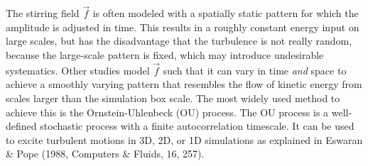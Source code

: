 The stirring field $\vec{f}$ is often modeled with a spatially static pattern for which the amplitude
is adjusted in time. This results in a roughly constant energy input on large scales, but has the
disadvantage that the turbulence is not really random, because the large-scale pattern is fixed, which
may introduce undesirable systematics. Other studies model $\vec{f}$ such that it can vary in time
\emph{and} space to achieve a smoothly varying pattern that resembles the flow of kinetic energy from
scales larger than the simulation box scale. The most widely used method to achieve this is the
Ornstein-Uhlenbeck (OU) process. The OU process is a well-defined stochastic process with a finite
autocorrelation timescale. It can be used to excite turbulent motions in 3D, 2D, or 1D simulations
as explained in Eswaran \& Pope (1988, Computers \& Fluids, 16, 257).

